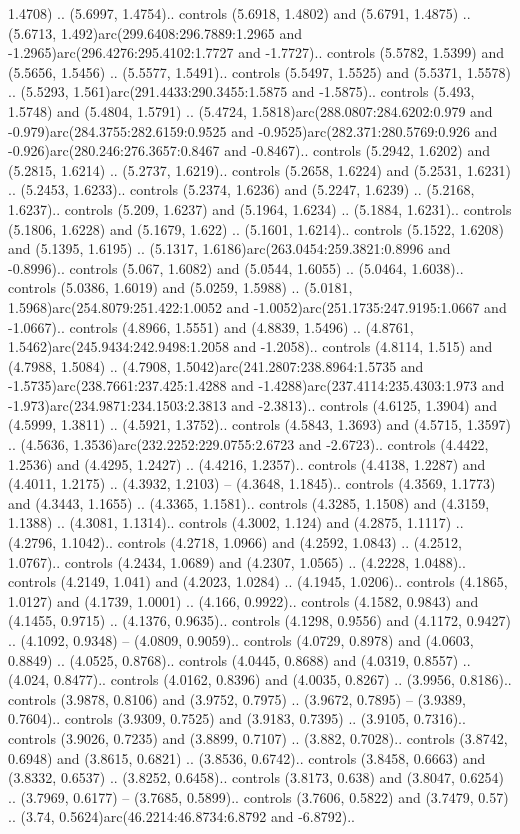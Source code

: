 1.4708) .. (5.6997, 1.4754).. controls (5.6918, 1.4802) and (5.6791, 1.4875) .. (5.6713, 1.492)arc(299.6408:296.7889:1.2965 and -1.2965)arc(296.4276:295.4102:1.7727 and -1.7727).. controls (5.5782, 1.5399) and (5.5656, 1.5456) .. (5.5577, 1.5491).. controls (5.5497, 1.5525) and (5.5371, 1.5578) .. (5.5293, 1.561)arc(291.4433:290.3455:1.5875 and -1.5875).. controls (5.493, 1.5748) and (5.4804, 1.5791) .. (5.4724, 1.5818)arc(288.0807:284.6202:0.979 and -0.979)arc(284.3755:282.6159:0.9525 and -0.9525)arc(282.371:280.5769:0.926 and -0.926)arc(280.246:276.3657:0.8467 and -0.8467).. controls (5.2942, 1.6202) and (5.2815, 1.6214) .. (5.2737, 1.6219).. controls (5.2658, 1.6224) and (5.2531, 1.6231) .. (5.2453, 1.6233).. controls (5.2374, 1.6236) and (5.2247, 1.6239) .. (5.2168, 1.6237).. controls (5.209, 1.6237) and (5.1964, 1.6234) .. (5.1884, 1.6231).. controls (5.1806, 1.6228) and (5.1679, 1.622) .. (5.1601, 1.6214).. controls (5.1522, 1.6208) and (5.1395, 1.6195) .. (5.1317, 1.6186)arc(263.0454:259.3821:0.8996 and -0.8996).. controls (5.067, 1.6082) and (5.0544, 1.6055) .. (5.0464, 1.6038).. controls (5.0386, 1.6019) and (5.0259, 1.5988) .. (5.0181, 1.5968)arc(254.8079:251.422:1.0052 and -1.0052)arc(251.1735:247.9195:1.0667 and -1.0667).. controls (4.8966, 1.5551) and (4.8839, 1.5496) .. (4.8761, 1.5462)arc(245.9434:242.9498:1.2058 and -1.2058).. controls (4.8114, 1.515) and (4.7988, 1.5084) .. (4.7908, 1.5042)arc(241.2807:238.8964:1.5735 and -1.5735)arc(238.7661:237.425:1.4288 and -1.4288)arc(237.4114:235.4303:1.973 and -1.973)arc(234.9871:234.1503:2.3813 and -2.3813).. controls (4.6125, 1.3904) and (4.5999, 1.3811) .. (4.5921, 1.3752).. controls (4.5843, 1.3693) and (4.5715, 1.3597) .. (4.5636, 1.3536)arc(232.2252:229.0755:2.6723 and -2.6723).. controls (4.4422, 1.2536) and (4.4295, 1.2427) .. (4.4216, 1.2357).. controls (4.4138, 1.2287) and (4.4011, 1.2175) .. (4.3932, 1.2103) -- (4.3648, 1.1845).. controls (4.3569, 1.1773) and (4.3443, 1.1655) .. (4.3365, 1.1581).. controls (4.3285, 1.1508) and (4.3159, 1.1388) .. (4.3081, 1.1314).. controls (4.3002, 1.124) and (4.2875, 1.1117) .. (4.2796, 1.1042).. controls (4.2718, 1.0966) and (4.2592, 1.0843) .. (4.2512, 1.0767).. controls (4.2434, 1.0689) and (4.2307, 1.0565) .. (4.2228, 1.0488).. controls (4.2149, 1.041) and (4.2023, 1.0284) .. (4.1945, 1.0206).. controls (4.1865, 1.0127) and (4.1739, 1.0001) .. (4.166, 0.9922).. controls (4.1582, 0.9843) and (4.1455, 0.9715) .. (4.1376, 0.9635).. controls (4.1298, 0.9556) and (4.1172, 0.9427) .. (4.1092, 0.9348) -- (4.0809, 0.9059).. controls (4.0729, 0.8978) and (4.0603, 0.8849) .. (4.0525, 0.8768).. controls (4.0445, 0.8688) and (4.0319, 0.8557) .. (4.024, 0.8477).. controls (4.0162, 0.8396) and (4.0035, 0.8267) .. (3.9956, 0.8186).. controls (3.9878, 0.8106) and (3.9752, 0.7975) .. (3.9672, 0.7895) -- (3.9389, 0.7604).. controls (3.9309, 0.7525) and (3.9183, 0.7395) .. (3.9105, 0.7316).. controls (3.9026, 0.7235) and (3.8899, 0.7107) .. (3.882, 0.7028).. controls (3.8742, 0.6948) and (3.8615, 0.6821) .. (3.8536, 0.6742).. controls (3.8458, 0.6663) and (3.8332, 0.6537) .. (3.8252, 0.6458).. controls (3.8173, 0.638) and (3.8047, 0.6254) .. (3.7969, 0.6177) -- (3.7685, 0.5899).. controls (3.7606, 0.5822) and (3.7479, 0.57) .. (3.74, 0.5624)arc(46.2214:46.8734:6.8792 and -6.8792).. 